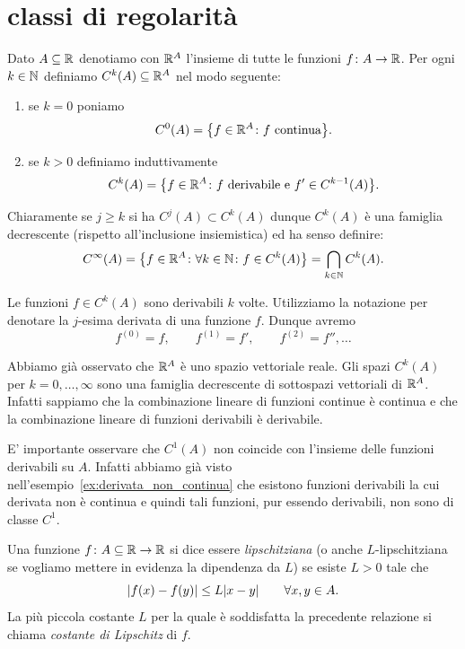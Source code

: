 \section{classi di regolarità}
%
\begin{definition}
\mymark{**}
Dato $A\subseteq \mathbb R$ denotiamo con $\mathbb R^A$ l'insieme di tutte le funzioni $f\colon A \to \mathbb R$.
Per ogni $k\in \mathbb N$ definiamo
$C^k(A) \subseteq \mathbb R^A$ nel modo seguente:
\begin{enumerate}
\item se $k=0$ poniamo
\[
  C^0(A) = {\left\{ f\in \mathbb R^A \colon \text{$f$ continua} \right\}}.
\]
\item
  se $k>0$ definiamo induttivamente
  \[
  C^{k}(A) = {\left\{ f\in \mathbb R^A \colon \text{$f$ derivabile e $f'\in C^{k-1}(A)$} \right\}}.
  \]
\end{enumerate}
Chiaramente se $j\ge k$ si ha $C^j(A) \subset C^k(A)$ dunque $C^k(A)$ è una famiglia decrescente (rispetto all'inclusione insiemistica) ed ha senso definire:
\[
  C^\infty(A) = {\left\{ f\in \mathbb R^A\colon \forall k \in \mathbb N\colon f\in C^k(A) \right\}} = \bigcap_{k\in \mathbb N} C^k(A).
\]

Le funzioni $f\in C^k(A)$ sono derivabili $k$ volte.
Utilizziamo la notazione  per denotare la $j$-esima derivata
di una funzione $f$.
Dunque avremo
\[
  f^{(0)} = f, \qquad
  f^{(1)} = f', \qquad
  f^{(2)} = f'', \dots
\]
\end{definition}

Abbiamo già osservato che $\mathbb R^A$ è uno spazio vettoriale reale.
Gli spazi $C^k(A)$ per $k=0, \dots, \infty$ sono una famiglia decrescente di sottospazi vettoriali di $\mathbb R^A$.
Infatti sappiamo che la combinazione lineare di funzioni continue è continua e che la combinazione lineare di funzioni derivabili è derivabile.

E' importante osservare che $C^1(A)$ non coincide con l'insieme delle funzioni derivabili su $A$. Infatti abbiamo già visto nell'esempio~\ref{ex:derivata_non_continua} che esistono funzioni derivabili la cui derivata non è continua e quindi tali funzioni, pur essendo derivabili, non sono di classe $C^1$.

\begin{definition}
\mymark{**}
Una funzione $f\colon A\subseteq \mathbb R \to \mathbb R$ si dice essere \emph{lipschitziana} (o anche $L$-lipschitziana se vogliamo mettere in evidenza la dipendenza da $L$) se esiste $L>0$ tale che
\[
  {\left|f(x) - f(y)\right|} \le L {\left|x-y\right|}\qquad \forall x,y\in A.
\]
La più piccola costante $L$ per la quale è soddisfatta la precedente relazione si chiama \emph{costante di Lipschitz}
di $f$.
\end{definition}

